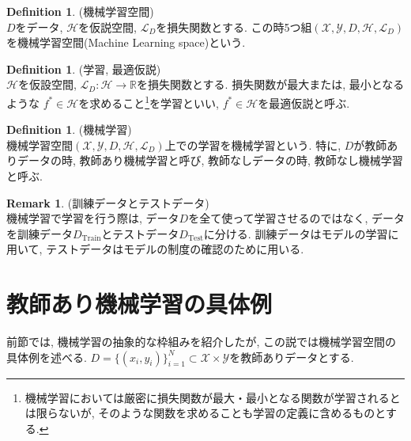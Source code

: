 \documentclass[11pt, a4paper, dvipdfmx]{jsarticle}
\theoremstyle{definition}
\newtheorem{Definition+}[Axiom+]{Definition}
\newtheorem{Remark+}[Axiom+]{Remark}
\newcommand{\R}{\mathbb{R}}
\newcommand{\X}{\mathcal{X}}
\newcommand{\Y}{\mathcal{Y}}
\newcommand{\Hil}{\mathcal{H}}
\newcommand{\Loss}{\mathcal{L}_{D}}
\newcommand{\MLsp}{(\X, \Y, D, \Hil, \Loss)}
\begin{document}
\begin{Definition+}(機械学習空間)\\
    $D$をデータ, $\Hil$を仮説空間, $\Loss$を損失関数とする. 
    この時5つ組$\MLsp$を機械学習空間(Machine Learning space)という.
\end{Definition+}
\begin{Definition+}(学習, 最適仮説)\\
    $\Hil$を仮設空間, $\Loss:\Hil\to\R$を損失関数とする. 損失関数が最大または, 最小となるような
    $f^*\in\Hil$を求めること\footnote{機械学習においては厳密に損失関数が最大・最小となる関数が学習されるとは限らないが, そのような関数を求めることも学習の定義に含めるものとする. }を学習といい, $f^*\in\Hil$を最適仮説と呼ぶ.
\end{Definition+}
\begin{Definition+}(機械学習)\\
    機械学習空間$\MLsp$上での学習を機械学習という. 特に, $D$が教師ありデータの時, 教師あり機械学習と呼び, 
    教師なしデータの時, 教師なし機械学習と呼ぶ.
\end{Definition+}
\begin{Remark+}(訓練データとテストデータ)\\
    機械学習で学習を行う際は, データ$D$を全て使って学習させるのではなく, 
    データを訓練データ$D_{\text{Train}}$とテストデータ$D_{\text{Test}}$に分ける. 
    訓練データはモデルの学習に用いて, テストデータはモデルの制度の確認のために用いる. 
\end{Remark+}
\section{教師あり機械学習の具体例}
前節では, 機械学習の抽象的な枠組みを紹介したが, この説では機械学習空間の具体例を述べる.
$D = \{(x_i, y_i)\}_{i = 1}^{N}\subset\X\times\Y$を教師ありデータとする.
\end{document}
